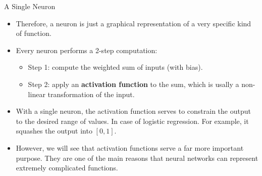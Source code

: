 \begin{frame} {A Single Neuron}
  \begin{itemize}
    \item Therefore, a neuron is just a graphical representation of a very specific kind of function.
    \vspace{4mm}
    \item Every neuron performs a 2-step computation:
      \begin{itemize}
        \item Step 1: compute the weighted sum of inputs (with bias).
        \item Step 2: apply an \textbf{activation function} to the sum,  which is usally  a non-linear transformation of the input.
      \end{itemize}
    \vspace{4mm}
    \item With a single neuron, the activation function serves to constrain the output to the desired range of values. In case of logistic regression. For example, it squashes the output into $[0, 1]$. 
    \vspace{4mm}
    \item However, we will see that activation functions serve a far more important purpose. They are one of the main reasons that neural networks can represent extremely complicated functions.
  \end{itemize}
\end{frame}

